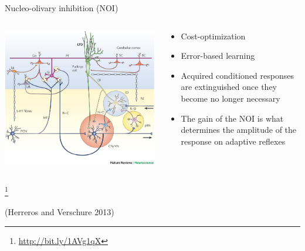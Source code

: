 \documentclass[ignorenonframetext,]{beamer}
\begin{document}
\begin{frame}{Nucleo-olivary inhibition (NOI)}

\begin{columns}[T]
\begin{column}[T]{5cm}
\includegraphics[]{images/nrn2332-f3.jpg}
\end{column}
\begin{column}[T]{5cm} %
\begin{itemize}
\item Cost-optimization
\item Error-based learning
\item Acquired conditioned responses are extinguished once they become no longer necessary
\item The gain of the NOI is what determines the amplitude of the response on adaptive reflexes
\end{itemize}
\end{column}
\end{columns}

\footnote{\url{http://bit.ly/1AVg1qX}}

(Herreros and Verschure 2013)

\end{frame}
\end{document}
